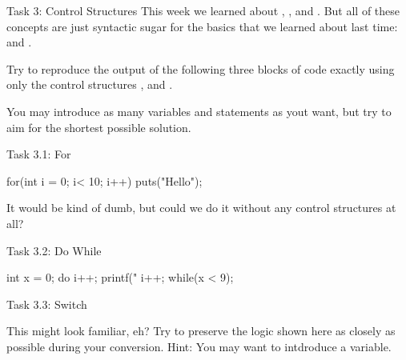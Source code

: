 \documentclass[10pt,graphics,aspectratio=169,table]{beamer}
\begin{document}
\begin{frame}[fragile]{Task 3: Control Structures}
This week we learned about , , and .
But all of these concepts are just syntactic sugar for the basics that 
we learned about last time:  and .

Try to reproduce the output of the following three blocks of code exactly 
using only the control structures ,  and .

You may introduce as many variables and statements as yout want, 
but try to aim for the shortest possible solution. 
\end{frame}

\begin{frame}[fragile]{Task 3.1: For}
\begin{codeblock}
for(int i = 0; i< 10; i++){
    puts("Hello");
}
\end{codeblock}

It would be kind of dumb, but could we do it without
any control structures at all?

\end{frame}
\begin{frame}[fragile]{Task 3.2: Do While}
\begin{codeblock}
    int x = 0;
    do{
        i++;
        printf("%
        i++;
    }while(x < 9);
\end{codeblock}

\end{frame}
\begin{frame}[fragile]{Task 3.3: Switch}

This might look familiar, eh? Try to preserve the logic shown here 
as closely as possible during your conversion. 
Hint: You may want to intdroduce a variable.
\end{frame}
\end{document}
